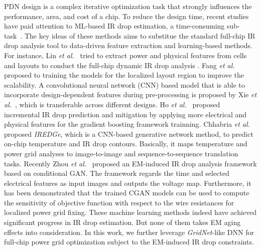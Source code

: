 PDN design is a complex iterative optimization task that strongly influences the performance, area, and cost of a chip. To reduce the design time, recent studies have paid attention to ML-based IR drop estimation, a time-consuming sub-task~\cite{LinFang:2018vts,Fang:2018dynireco,HoKahng:ICCAD'19,Xie:2020powernet,Sachin:ASPDAC'21}. 
The key ideas of these methods aims to substitue the standard full-chip IR drop analysis tool to data-driven feature extraction and learning-based methods. For instance, Lin {\it et al.}~\cite{LinFang:2018vts} tried to extract power and physical features from cells and layouts to conduct the full-chip dynamic IR drop analysis . Fang {\it et al.}~\cite{Fang:2018dynireco} proposed to training the models for the localized layout region to improve the scalability.  A convolutional neural network (CNN) based model that is able to incorporate design-dependent features during pre-processing is proposed by Xie {\it et al.}~\cite{Xie:2020powernet}, which is transferable across different designs.
Ho {\it et al.}~\cite{HoKahng:ICCAD'19} proposed incremental IR drop prediction and mitigation by applying more electrical and physical features for the gradient boosting framework trainning. Chhabria {\it et al.}~\cite{Sachin:ASPDAC'21} proposed {\it IREDGe}, which is a CNN-based generative network method, to predict on-chip temperature and IR drop contours. Basically, it maps temperature and power grid analyses to image-to-image and sequence-to-sequence translation tasks.
Recently Zhou {\it et al.}~\cite{ZhouJin:ICCAD'20} proposed an EM-induced IR drop analysis framework based on conditional GAN. The framework regards the time and selected electrical features as input images and outputs the voltage map. Furthermore, it has been demonstrated that the trained CGAN models can be used to compute the sensitivity of objective function with respect to the wire resistances for localized power grid fixing.  These machine learning methods indeed have achieved significant progress in IR drop estimation. But none of them takes EM aging effects into consideration.
In this work, we further leverage {\it GridNet}-like DNN for full-chip power grid optimization subject to the EM-induced IR drop constraints.

